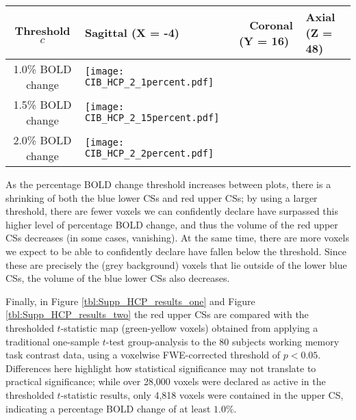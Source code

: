 \begin{table}[htbp]
\hspace*{-0.5cm}
\begin{adjustbox}{center}
\centering
    \begin{tabular}{cm{50mm}m{50mm}m{50mm}}
       \toprule
         Threshold $c$ & \hspace{1.4cm} Sagittal (X = -4) & \ \hspace{1.2cm} Coronal (Y = 16) & \hspace{1.0cm} Axial (Z = 48)\\
        \midrule
        1.0\% BOLD change & \texttt{[image: CIB\_HCP\_2\_1percent.pdf]}\\
        1.5\% BOLD change & \texttt{[image: CIB\_HCP\_2\_15percent.pdf]}\\
        2.0\% BOLD change & \texttt{[image: CIB\_HCP\_2\_2percent.pdf]}\\
        \bottomrule
    \end{tabular}
\end{adjustbox}
    \label{tbl:HCP_results_two}
\end{table}

As the percentage BOLD change threshold increases between plots, there is a shrinking of both the blue lower CSs and red upper CSs; by using a larger threshold, there are fewer voxels we can confidently declare have surpassed this higher level of percentage BOLD change, and thus the volume of the red upper CSs decreases (in some cases, vanishing). At the same time, there are more voxels we expect to be able to confidently declare have fallen below the threshold. Since these are precisely the (grey background) voxels that lie outside of the lower blue CSs, the volume of the blue lower CSs also decreases. 

Finally, in Figure \ref{tbl:Supp_HCP_results_one} and Figure \ref{tbl:Supp_HCP_results_two} the red upper CSs are compared with the thresholded $t$-statistic map (green-yellow voxels) obtained from applying a traditional one-sample $t$-test group-analysis to the 80 subjects working memory task contrast data, using a voxelwise FWE-corrected threshold of $p < 0.05$. Differences here highlight how statistical significance may not translate to practical significance; while over 28,000 voxels were declared as active in the thresholded $t$-statistic results, only 4,818 voxels were contained in the upper CS, indicating a percentage BOLD change of at least $1.0\%$. 

